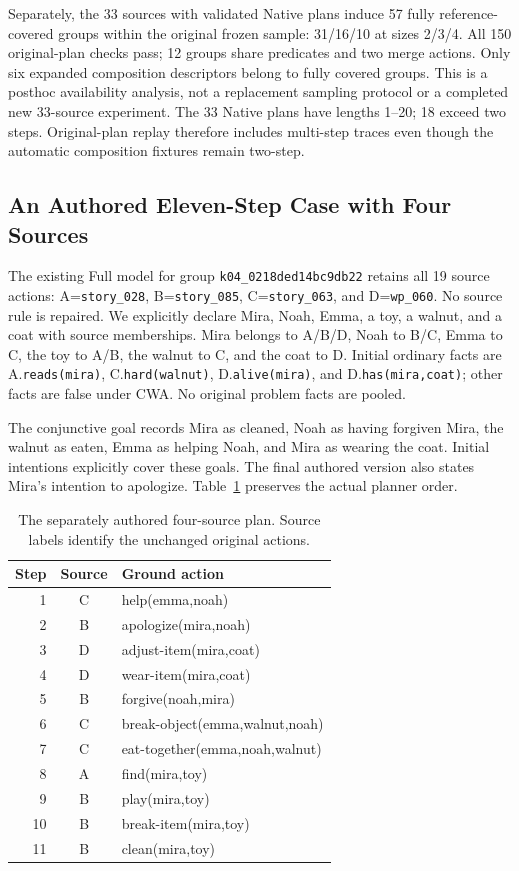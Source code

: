 Separately, the 33 sources with validated Native plans induce 57 fully reference-covered groups within the original frozen sample: 31/16/10 at sizes 2/3/4. All 150 original-plan checks pass; 12 groups share predicates and two merge actions. Only six expanded composition descriptors belong to fully covered groups. This is a posthoc availability analysis, not a replacement sampling protocol or a completed new 33-source experiment. The 33 Native plans have lengths 1--20; 18 exceed two steps. Original-plan replay therefore includes multi-step traces even though the automatic composition fixtures remain two-step.

\subsection{An Authored Eleven-Step Case with Four Sources}
The existing Full model for group \texttt{k04\_0218ded14bc9db22} retains all 19 source actions: A=\texttt{story\_028}, B=\texttt{story\_085}, C=\texttt{story\_063}, and D=\texttt{wp\_060}. No source rule is repaired. We explicitly declare Mira, Noah, Emma, a toy, a walnut, and a coat with source memberships. Mira belongs to A/B/D, Noah to B/C, Emma to C, the toy to A/B, the walnut to C, and the coat to D. Initial ordinary facts are A.\texttt{reads(mira)}, C.\texttt{hard(walnut)}, D.\texttt{alive(mira)}, and D.\texttt{has(mira,coat)}; other facts are false under CWA. No original problem facts are pooled.

The conjunctive goal records Mira as cleaned, Noah as having forgiven Mira, the walnut as eaten, Emma as helping Noah, and Mira as wearing the coat. Initial intentions explicitly cover these goals. The final authored version also states Mira's intention to apologize. Table~\ref{tab:four-source-long-plan} preserves the actual planner order.

\begin{table}[t]
\centering
\caption{The separately authored four-source plan. Source labels identify the unchanged original actions.}
\label{tab:four-source-long-plan}
\begin{tabular}{rcl}
\toprule
Step & Source & Ground action\\
\midrule
1 & C & help(emma,noah)\\
2 & B & apologize(mira,noah)\\
3 & D & adjust-item(mira,coat)\\
4 & D & wear-item(mira,coat)\\
5 & B & forgive(noah,mira)\\
6 & C & break-object(emma,walnut,noah)\\
7 & C & eat-together(emma,noah,walnut)\\
8 & A & find(mira,toy)\\
9 & B & play(mira,toy)\\
10 & B & break-item(mira,toy)\\
11 & B & clean(mira,toy)\\
\bottomrule
\end{tabular}
\end{table}

